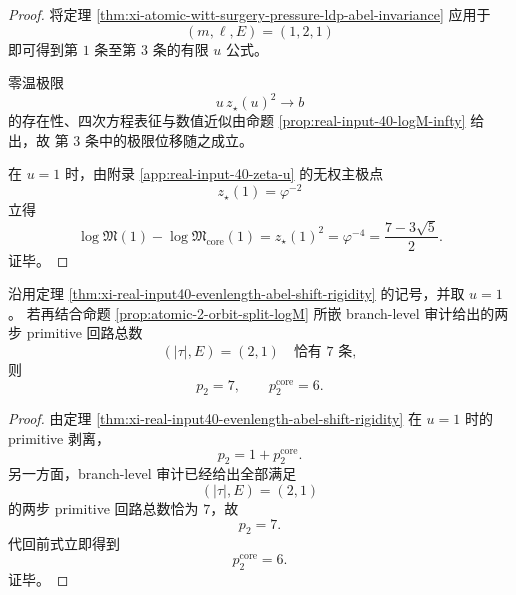 \begin{proof}
将定理 \ref{thm:xi-atomic-witt-surgery-pressure-ldp-abel-invariance} 应用于
\[
(m,\ell,E)=(1,2,1)
\]
即可得到第 \(1\) 条至第 \(3\) 条的有限 \(u\) 公式。

零温极限
\[
u\,z_\star(u)^2\longrightarrow b
\]
的存在性、四次方程表征与数值近似由命题 \ref{prop:real-input-40-logM-infty} 给出，故
第 \(3\) 条中的极限位移随之成立。

在 \(u=1\) 时，由附录 \ref{app:real-input-40-zeta-u} 的无权主极点
\[
z_\star(1)=\varphi^{-2}
\]
立得
\[
\log\mathfrak M(1)-\log\mathfrak M_{\mathrm{core}}(1)=z_\star(1)^2=\varphi^{-4}
=\frac{7-3\sqrt5}{2}.
\]
证毕。
\end{proof}
\begin{corollary}\label{cor:xi-real-input40-primitive-two-step-exact-count}
沿用定理 \ref{thm:xi-real-input40-evenlength-abel-shift-rigidity} 的记号，并取 \(u=1\)。
若再结合命题 \ref{prop:atomic-2-orbit-split-logM} 所嵌 branch-level 审计给出的两步 primitive 回路总数
\[
(|\tau|,E)=(2,1)\quad\text{恰有 }7\text{ 条},
\]
则
\[
\boxed{\;
p_2=7,
\qquad
p_2^{\mathrm{core}}=6.\;}
\]
\end{corollary}
\begin{proof}
由定理 \ref{thm:xi-real-input40-evenlength-abel-shift-rigidity} 在 \(u=1\) 时的 primitive 剥离，
\[
p_2=1+p_2^{\mathrm{core}}.
\]
另一方面，branch-level 审计已经给出全部满足
\[
(|\tau|,E)=(2,1)
\]
的两步 primitive 回路总数恰为 \(7\)，故
\[
p_2=7.
\]
代回前式立即得到
\[
p_2^{\mathrm{core}}=6.
\]
证毕。
\end{proof}
